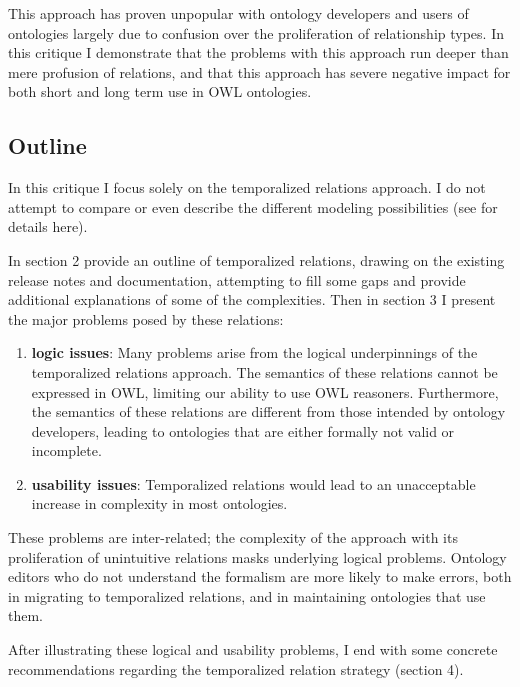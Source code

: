 \documentclass{bioinfo}
\begin{document}
This approach has proven unpopular with ontology developers and users
of ontologies largely due to confusion over the proliferation of
relationship types\cite{BFO2InformalSurvey}. In this critique I
demonstrate that the problems with this approach run deeper than mere
profusion of relations, and that this approach has severe negative
impact for both short and long term use in OWL ontologies.

\subsection{Outline}

In this critique I focus solely on the temporalized relations
approach. I do not attempt to compare or even describe the different
modeling possibilities (see \cite{Grewe} for details here).

In section 2 provide an outline of temporalized relations, drawing on
the existing release notes and documentation, attempting to fill some
gaps and provide additional explanations of some of the
complexities. Then in section 3 I present the major problems posed by
these relations:

\begin{enumerate}

\item \textbf{logic issues}: Many problems arise from the logical
  underpinnings of the temporalized relations approach. The semantics
  of these relations cannot be expressed in OWL, limiting our ability
  to use OWL reasoners. Furthermore, the semantics of these relations
  are different from those intended by ontology developers, leading to
  ontologies that are either formally not valid or incomplete.

\item \textbf{usability issues}: Temporalized relations would lead to
  an unacceptable increase in complexity in most ontologies.

\end{enumerate}

These problems are inter-related; the complexity of the approach with
its proliferation of unintuitive relations masks underlying logical
problems. Ontology editors who do not understand the formalism are
more likely to make errors, both in migrating to temporalized
relations, and in maintaining ontologies that use them.

After illustrating these logical and usability problems, I end with
some concrete recommendations regarding the temporalized relation
strategy (section 4).
\end{document}
